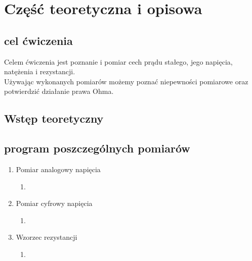 \documentclass{extarticle}  %
\begin{document}
    \section{Część teoretyczna i opisowa}
        \subsection{cel ćwiczenia}
            \begin{flushleft}
                Celem ćwiczenia jest poznanie i pomiar cech prądu stałego, jego napięcia, natężenia i rezystancji.\\
                Używając wykonanych pomiarów możemy poznać niepewności pomiarowe oraz potwierdzić działanie prawa Ohma.
            \end{flushleft}
        \subsection{Wstęp teoretyczny}

        \subsection{program poszczególnych pomiarów}
            \begin{enumerate}
                \item Pomiar analogowy napięcia
                \begin{enumerate}
                    \item
                \end{enumerate}
                \item Pomiar cyfrowy napięcia
                    \begin{enumerate}
                        \item
                    \end{enumerate}
                \item Wzorzec rezystancji
                    \begin{enumerate}
                        \item
                    \end{enumerate}
            \end{enumerate}
\end{document}
